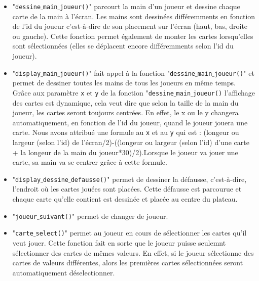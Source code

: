 \documentclass[french,12pt]{article}
\begin{document}
\begin{itemize}
\item "\texttt{dessine$\_$main$\_$joueur()}" parcourt la main d'un joueur et dessine chaque carte de la main à l'écran. Les mains sont dessinées différemments en fonction de l'id du joueur c'est-à-dire de son placement sur l'écran (haut, bas, droite ou gauche). Cette fonction permet également de monter les cartes lorsqu'elles sont sélectionnées (elles se déplacent encore différemments selon l'id du joueur).\\

\item "\texttt{display$\_$main$\_$joueur()}" fait appel à la fonction "\texttt{dessine$\_$main$\_$joueur()}" et permet de dessiner toutes les mains de tous les joueurs en même temps. Grâce aux paramètre \texttt{x} et \texttt{y} de la fonction "\texttt{dessine$\_$main$\_$joueur()} l'affichage des cartes est dynamique, cela veut dire que selon la taille de la main du joueur, les cartes seront toujours centrées. En effet, le x ou le y changera automatiquement, en fonction de l'id du joueur, quand le joueur jouera une carte. Nous avons attribué une formule au \texttt{x} et au \texttt{y} qui est : (longeur ou largeur (selon l'id) de l'écran/2)-((longeur ou largeur (selon l'id) d'une carte + la longeur de la main du joueur*30)/2).Lorsque le joueur va jouer une carte, sa main va se centrer grâce à cette formule.\\

\item "\texttt{display$\_$dessine$\_$defausse()}" permet de dessiner la défausse, c'est-à-dire, l'endroit où les cartes jouées sont placées. Cette défausse est parcourue et chaque carte qu'elle contient est dessinée et placée au centre du plateau.\\

\item "\texttt{joueur$\_$suivant()}" permet de changer de joueur.\\

\item "\texttt{carte$\_$select()}" permet au joueur en cours de sélectionner les cartes qu'il veut jouer. Cette fonction fait en sorte que le joueur puisse seulemnt sélectionner des cartes de mêmes valeurs.
En effet, si le joueur sélectionne des cartes de valeurs différentes, alors les premières cartes sélectionnées seront automatiquement déselectionner.\\


\end{itemize}
\end{document}
